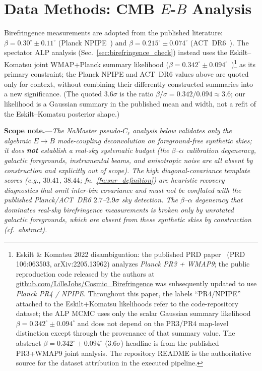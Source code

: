 \documentclass[aps,prd,twocolumn,superscriptaddress,showpacs,preprintnumbers,nofootinbib,longbibliography,floatfix]{revtex4-2}
\begin{document}
\section{Data Methods: CMB $E$-$B$ Analysis}\label{sec:data_cmb}

Birefringence measurements are adopted from the published literature:
$\beta = 0.30^\circ\pm 0.11^\circ$ (Planck NPIPE~\cite{DiegoPalazuelos2022}) and
$\beta = 0.215^\circ\pm 0.074^\circ$ (ACT~DR6~\cite{DiegoPalazuelos2025}).
The spectator ALP analysis (Sec.~\ref{sec:birefringence_check}) instead uses
the Eskilt--Komatsu joint WMAP+Planck summary likelihood
($\beta = 0.342^\circ\pm 0.094^\circ$~\cite{Eskilt2022})\footnote{\label{fn:eskilt_pr3_pr4}Eskilt
\& Komatsu 2022 disambiguation: the published PRD
paper~\cite{Eskilt2022} (PRD 106:063503, arXiv:2205.13962) analyzes
\emph{Planck PR3 + WMAP9}; the public reproduction code released by the
authors at \href{https://github.com/LilleJohs/Cosmic_Birefringence}{github.com/LilleJohs/Cosmic\_Birefringence}
was subsequently updated to use \emph{Planck PR4 / NPIPE}. Throughout
this paper, the labels ``PR4/NPIPE'' attached to the Eskilt+Komatsu
likelihoods refer to the code-repository dataset; the ALP MCMC uses only
the scalar Gaussian summary likelihood $\beta=0.342^\circ\pm 0.094^\circ$
and does not depend on the PR3/PR4 map-level distinction except through
the provenance of that summary value. The abstract
$\beta=0.342^\circ\pm 0.094^\circ$
($3.6\sigma$) headline is from the published PR3+WMAP9 joint analysis.
The repository README is the authoritative source for the dataset
attribution in the executed pipeline.} as its primary
constraint; the Planck NPIPE and ACT~DR6 values above are quoted only for
context, without combining their differently constructed summaries into a
new significance. (The quoted $3.6\sigma$ is the ratio
$\beta/\sigma = 0.342/0.094 \approx 3.6$; our likelihood is a Gaussian
summary in the published mean and width, not a refit of the
Eskilt--Komatsu posterior shape.)

\noindent\textbf{Scope note.}---\emph{The NaMaster pseudo-$C_\ell$ analysis
below validates only the algebraic $E\!\to\!B$ mode-coupling deconvolution on
foreground-free synthetic skies; it does \textbf{not} establish a real-sky
systematic budget (the $\beta$--$\alpha$ calibration degeneracy, galactic
foregrounds, instrumental beams, and anisotropic noise are all absent by
construction and explicitly out of scope).
The high diagonal-covariance template scores
(e.g., $30.41$, $38.44$; fn.~\ref{fn:snr_definition}) are heuristic recovery
diagnostics that omit inter-bin covariance and
\emph{must not} be conflated with the published Planck/ACT~DR6 $2.7$--$2.9\sigma$
sky detection. The $\beta$--$\alpha$ degeneracy that dominates real-sky
birefringence measurements is broken only by unrotated galactic foregrounds,
which are absent from these synthetic skies by construction (cf.\ abstract).}
\end{document}
